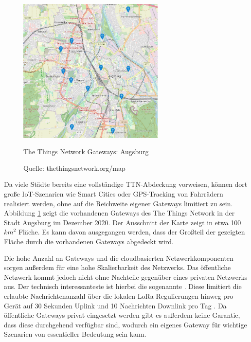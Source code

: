 \begin{figure}[H]
  \begin{center}
    \includegraphics[width=0.65\textwidth]{./images/augsburg-coverage.png}  
    \end{center}
  \vspace{-5pt}
  \caption[The Things Network Gateways: Augsburg]{The Things Network Gateways: Augsburg}
  \caption*{Quelle: {thethingsnetwork.org/map}}
  \label{fig:augsburg-coverage}
  \vspace{-5pt}
\end{figure}

Da viele Städte bereits eine vollständige TTN-Abdeck\-ung vorweisen, können dort große IoT-Szenarien wie Smart Cities oder GPS-Tracking von Fahrrädern realisiert werden, ohne auf die Reichweite eigener Gateways limitiert zu sein. Abbildung \ref{fig:augsburg-coverage} zeigt die vorhandenen Gateways des The Things Network in der Stadt Augsburg im Dezember 2020. Der Ausschnitt der Karte zeigt in etwa 100 $km^2$ Fläche. Es kann davon ausgegangen werden, dass der Großteil der gezeigten Fläche durch die vorhandenen Gateways abgedeckt wird.

Die hohe Anzahl an Gateways und die cloudbasierten Netzwerkkomponenten sorgen außerdem für eine hohe Skalierbarkeit des Netzwerks. Das öffentliche Netzwerk kommt jedoch nicht ohne Nachteile gegenüber eines privaten Netzwerks aus. Der technisch interessanteste ist hierbei die sogenannte . Diese limitiert die erlaubte Nachrichtenanzahl über die lokalen LoRa-Regulierungen hinweg pro Gerät auf 30 Sekunden Uplink und 10 Nachrichten Downlink pro Tag . Da öffentliche Gateways privat eingesetzt werden gibt es außerdem keine Garantie, dass diese durchgehend verfügbar sind, wodurch ein eigenes Gateway für wichtige Szenarien von essentieller Bedeutung sein kann.

